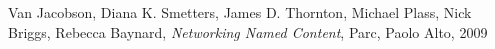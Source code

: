 

\begin{thebibliography}{99}

  Van Jacobson, Diana K. Smetters, James D. Thornton, Michael Plass, Nick Briggs, Rebecca Baynard,
  \emph{Networking Named Content},
  Parc, Paolo Alto, 2009

\end{thebibliography}
